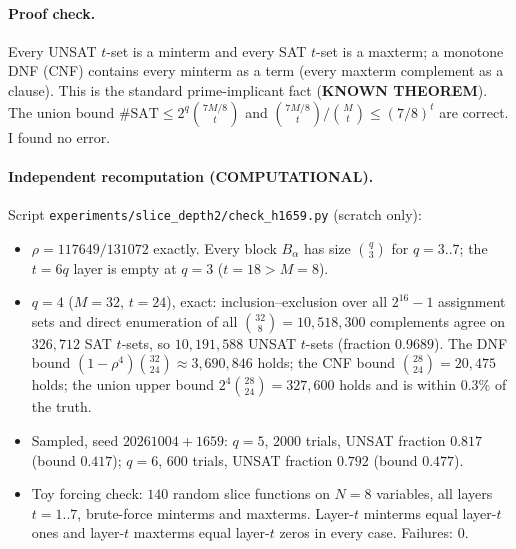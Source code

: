 \documentclass[11pt]{article}
\begin{document}
\paragraph{Proof check.} Every UNSAT $t$-set is a minterm and every SAT $t$-set is a maxterm; a monotone DNF (CNF) contains every
minterm as a term (every maxterm complement as a clause). This is the standard prime-implicant fact (\textbf{KNOWN THEOREM}).
The union bound $\#\mathrm{SAT}\le2^q\binom{7M/8}{t}$ and $\binom{7M/8}{t}/\binom Mt\le(7/8)^t$ are correct. I found no error.

\paragraph{Independent recomputation (COMPUTATIONAL).} Script \texttt{experiments/slice\_depth2/check\_h1659.py} (scratch only):
\begin{itemize}
\item $\rho=117649/131072$ exactly. Every block $B_\alpha$ has size $\binom q3$ for $q=3..7$; the $t=6q$ layer is empty at $q=3$ ($t=18>M=8$).
\item $q=4$ ($M=32$, $t=24$), exact: inclusion--exclusion over all $2^{16}-1$ assignment sets and direct enumeration of all
$\binom{32}{8}=10{,}518{,}300$ complements agree on $326{,}712$ SAT $t$-sets, so $10{,}191{,}588$ UNSAT $t$-sets (fraction $0.9689$).
The DNF bound $(1-\rho^4)\binom{32}{24}\approx3{,}690{,}846$ holds; the CNF bound $\binom{28}{24}=20{,}475$ holds; the union upper bound
$2^4\binom{28}{24}=327{,}600$ holds and is within $0.3\%$ of the truth.
\item Sampled, seed $20261004{+}1659$: $q=5$, $2000$ trials, UNSAT fraction $0.817$ (bound $0.417$); $q=6$, $600$ trials, UNSAT fraction $0.792$ (bound $0.477$).
\item Toy forcing check: $140$ random slice functions on $N=8$ variables, all layers $t=1..7$, brute-force minterms and maxterms.
Layer-$t$ minterms equal layer-$t$ ones and layer-$t$ maxterms equal layer-$t$ zeros in every case. Failures: $0$.
\end{itemize}
\end{document}
